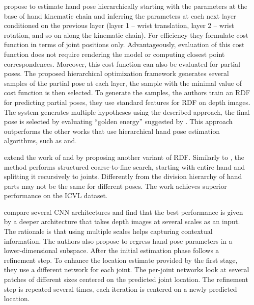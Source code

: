 \hspace{-0.4em}
\textbf{\cite{tang2015opening}} 
propose to estimate hand pose hierarchically starting with the parameters at the base of hand kinematic chain and inferring the parameters at each next layer conditioned on the previous layer (layer 1 – wrist translation, layer 2 – wrist rotation, and so on along the kinematic chain). For efficiency they formulate cost function in terms of joint positions only. Advantageously, evaluation of this cost function does not require rendering the model or computing closest point correspondences. Moreover, this cost function can also be evaluated for partial poses. The proposed hierarchical optimization framework generates several samples of the partial pose at each layer, the sample with the minimal value of cost function is then selected. To generate the samples, the authors train an RDF for predicting partial poses, they use standard features for RDF on depth images. The system generates multiple hypotheses using the described approach, the final pose is selected by evaluating “golden energy” suggested by \cite{sharp2015accurate}. This approach outperforms the other works that use hierarchical hand pose estimation algorithms, such as \cite{tang_cvpr14} and\cite{sun2015cascaded}.

\hspace{-0.4em}
\textbf{\cite{li20153d}} 
extend the work of \cite{keskin2012hand} and \cite{tang2015opening} by proposing another variant of RDF. Similarly to \cite{tang_cvpr14}, the method performs structured coarse-to-fine search, starting with entire hand and splitting it recursively to joints. Differently from  \cite{tang_cvpr14} the division hierarchy of hand parts may not be the same for different poses. The work achieves superior performance on the ICVL dataset.

\hspace{-0.4em}
\textbf{\cite{oberweger2015hands}} 
compare several CNN architectures and find that the best performance is given by a deeper architecture that takes depth images at several scales as an input. The rationale is that using multiple scales helps capturing contextual information. The authors also propose to regress hand pose parameters in a lower-dimensional subspace. After the initial estimation phase follows a refinement step. To enhance the location estimate provided by the first stage, they use a different network for each joint. The per-joint networks look at several patches of different sizes centered on the predicted joint location. The refinement step is repeated several times, each iteration is centered on a newly predicted location.

